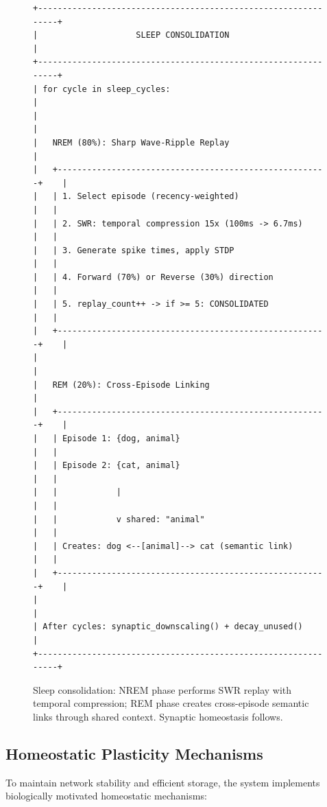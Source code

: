 \documentclass[11pt]{article}
\begin{document}
\begin{figure}[ht]
\centering
\begin{Verbatim}[fontsize=\scriptsize,frame=single]
+---------------------------------------------------------------+
|                    SLEEP CONSOLIDATION                         |
+---------------------------------------------------------------+
| for cycle in sleep_cycles:                                     |
|                                                                |
|   NREM (80%): Sharp Wave-Ripple Replay                         |
|   +-------------------------------------------------------+    |
|   | 1. Select episode (recency-weighted)                   |   |
|   | 2. SWR: temporal compression 15x (100ms -> 6.7ms)      |   |
|   | 3. Generate spike times, apply STDP                    |   |
|   | 4. Forward (70%) or Reverse (30%) direction            |   |
|   | 5. replay_count++ -> if >= 5: CONSOLIDATED             |   |
|   +-------------------------------------------------------+    |
|                                                                |
|   REM (20%): Cross-Episode Linking                             |
|   +-------------------------------------------------------+    |
|   | Episode 1: {dog, animal}                               |   |
|   | Episode 2: {cat, animal}                               |   |
|   |            |                                           |   |
|   |            v shared: "animal"                          |   |
|   | Creates: dog <--[animal]--> cat (semantic link)        |   |
|   +-------------------------------------------------------+    |
|                                                                |
| After cycles: synaptic_downscaling() + decay_unused()          |
+---------------------------------------------------------------+
\end{Verbatim}
\caption{Sleep consolidation: NREM phase performs SWR replay with temporal compression; REM phase creates cross-episode semantic links through shared context. Synaptic homeostasis follows.}
\label{fig:sleep}
\end{figure}

\subsection{Homeostatic Plasticity Mechanisms}

To maintain network stability and efficient storage, the system implements biologically motivated
homeostatic mechanisms:
\end{document}
